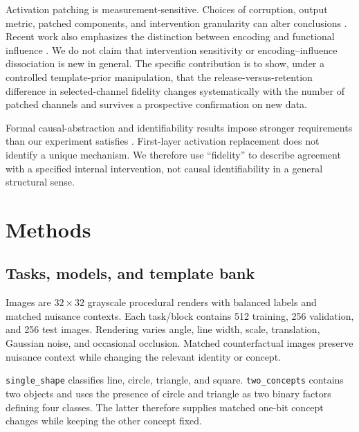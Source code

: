 \documentclass[10pt]{article}
\begin{document}
Activation patching is measurement-sensitive. Choices of corruption, output metric, patched components, and intervention granularity can alter conclusions \citep{zhang_2024_activation-patching,heimersheim_2024_activation-patching,miller_2024_circuit-faithfulness}. Recent work also emphasizes the distinction between encoding and functional influence \citep{nicolson_2025_explaining-explainability,sharma_2026_encoding-without-influence}. We do not claim that intervention sensitivity or encoding--influence dissociation is new in general. The specific contribution is to show, under a controlled template-prior manipulation, that the release-versus-retention difference in selected-channel fidelity changes systematically with the number of patched channels and survives a prospective confirmation on new data.

Formal causal-abstraction and identifiability results impose stronger requirements than our experiment satisfies \citep{geiger_2025_causal-abstraction,meloux_2025_mechanistic-identifiability,sutter_2025_causal-abstraction-limits}. First-layer activation replacement does not identify a unique mechanism. We therefore use ``fidelity'' to describe agreement with a specified internal intervention, not causal identifiability in a general structural sense.

\section{Methods}\label{sec:methods}

\subsection{Tasks, models, and template bank}\label{sec:tasks-models}

Images are $32\times32$ grayscale procedural renders with balanced labels and matched nuisance contexts. Each task/block contains 512 training, 256 validation, and 256 test images. Rendering varies angle, line width, scale, translation, Gaussian noise, and occasional occlusion. Matched counterfactual images preserve nuisance context while changing the relevant identity or concept.

\texttt{single\_shape} classifies line, circle, triangle, and square. \texttt{two\_concepts} contains two objects and uses the presence of circle and triangle as two binary factors defining four classes. The latter therefore supplies matched one-bit concept changes while keeping the other concept fixed.
\end{document}

